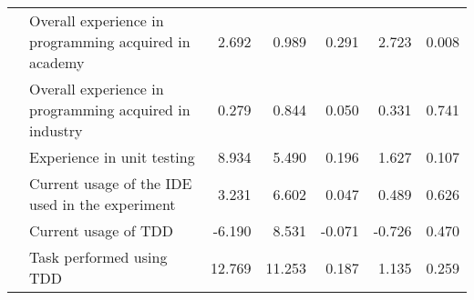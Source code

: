 \begin{table}[h]
{\begin{tabular}{|llrrrrr}
\multicolumn{1}{|l|}{}                                 & \multicolumn{1}{l|}{{\color[HTML]{FD6864} Overall experience in programming acquired in academy}}       & \multicolumn{1}{r|}{{\color[HTML]{FD6864} 2.692}}   & \multicolumn{1}{r|}{{\color[HTML]{FD6864} 0.989}} & \multicolumn{1}{r|}{{\color[HTML]{FD6864} 0.291}}       & \multicolumn{1}{r|}{{\color[HTML]{FD6864} 2.723}}  & \multicolumn{1}{r|}{{\color[HTML]{FD6864} 0.008}}    \\ \cline{2-7} 
\multicolumn{1}{|l|}{}                                 & \multicolumn{1}{l|}{Overall experience in programming acquired in industry}                             & \multicolumn{1}{r|}{0.279}                          & \multicolumn{1}{r|}{0.844}                        & \multicolumn{1}{r|}{0.050}                              & \multicolumn{1}{r|}{0.331}                         & \multicolumn{1}{r|}{0.741}                           \\ \cline{2-7} 
\multicolumn{1}{|l|}{}                                 & \multicolumn{1}{l|}{Experience in unit testing}                                                         & \multicolumn{1}{r|}{8.934}                          & \multicolumn{1}{r|}{5.490}                        & \multicolumn{1}{r|}{0.196}                              & \multicolumn{1}{r|}{1.627}                         & \multicolumn{1}{r|}{0.107}                           \\ \cline{2-7} 
\multicolumn{1}{|l|}{}                                 & \multicolumn{1}{l|}{Current usage of the IDE used in the experiment}                                    & \multicolumn{1}{r|}{3.231}                          & \multicolumn{1}{r|}{6.602}                        & \multicolumn{1}{r|}{0.047}                              & \multicolumn{1}{r|}{0.489}                         & \multicolumn{1}{r|}{0.626}                           \\ \cline{2-7} 
\multicolumn{1}{|l|}{}                                 & \multicolumn{1}{l|}{Current usage of TDD}                                                               & \multicolumn{1}{r|}{-6.190}                         & \multicolumn{1}{r|}{8.531}                        & \multicolumn{1}{r|}{-0.071}                             & \multicolumn{1}{r|}{-0.726}                        & \multicolumn{1}{r|}{0.470}                           \\ \cline{2-7} 
\multicolumn{1}{|l|}{}                                 & \multicolumn{1}{l|}{Task performed using TDD}                                                           & \multicolumn{1}{r|}{12.769}                         & \multicolumn{1}{r|}{11.253}                       & \multicolumn{1}{r|}{0.187}                              & \multicolumn{1}{r|}{1.135}                         & \multicolumn{1}{r|}{0.259}                           \\ \cline{2-7} 

\end{tabular}}
\end{table}

